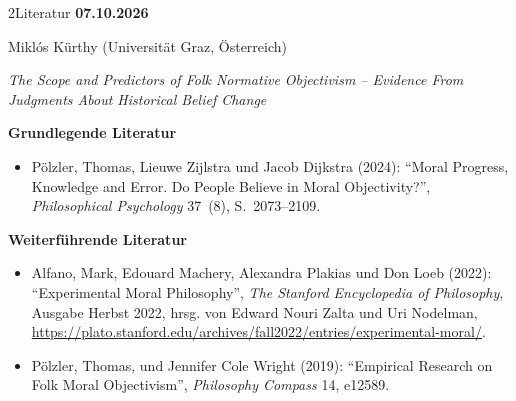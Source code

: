 \documentclass[xcolor=table,9pt,aspectratio=169]{beamer}
\begin{document}
\begin{frame}{\vspace*{10mm}2\hspace*{1em}Literatur}
\textbf{07.10.2026}

\smallskip
Miklós Kürthy (Universität Graz, Österreich)

\medskip
\textit{The Scope and Predictors of Folk Normative Objectivism – Evidence From Judgments About Historical Belief Change}


\medskip
\textbf{Grundlegende Literatur}
{\footnotesize
\begin{itemize}[label=,leftmargin=2em,itemindent=-2em]
   \item Pölzler, Thomas, Lieuwe Zijlstra und Jacob Dijkstra (2024): \enquote{Moral Progress, Knowledge and Error. Do People Believe in Moral Objectivity?}, \textit{Philosophical Psychology} 37~(8), S.~2073--2109.
\end{itemize}
}

\medskip
\textbf{Weiterführende Literatur}
{\footnotesize
\begin{itemize}[label=,leftmargin=2em,itemindent=-2em]
   \item Alfano, Mark, Edouard Machery, Alexandra Plakias und Don Loeb (2022): \enquote{Experimental Moral Philosophy}, \textit{The Stanford Encyclopedia of Philosophy}, Ausgabe Herbst 2022, hrsg. von Edward Nouri Zalta und Uri Nodelman, \url{https://plato.stanford.edu/archives/fall2022/entries/experimental-moral/}.
   \item Pölzler, Thomas, und Jennifer Cole Wright (2019): \enquote{Empirical Research on Folk Moral Objectivism}, \textit{Philosophy Compass} 14, e12589.
\end{itemize}
}
\end{frame}
\end{document}
